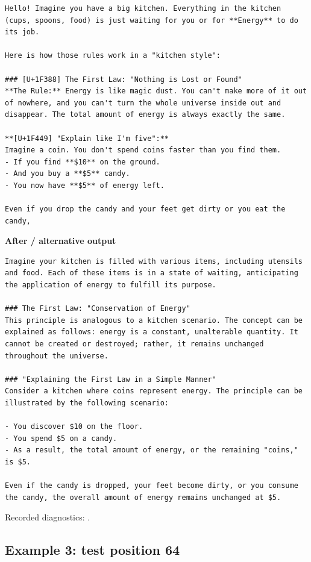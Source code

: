 \begin{Verbatim}
Hello! Imagine you have a big kitchen. Everything in the kitchen (cups, spoons, food) is just waiting for you or for **Energy** to do its job.

Here is how those rules work in a "kitchen style":

### [U+1F388] The First Law: "Nothing is Lost or Found"
**The Rule:** Energy is like magic dust. You can't make more of it out of nowhere, and you can't turn the whole universe inside out and disappear. The total amount of energy is always exactly the same.

**[U+1F449] "Explain like I'm five":**
Imagine a coin. You don't spend coins faster than you find them.
- If you find **$10** on the ground.
- And you buy a **$5** candy.
- You now have **$5** of energy left.

Even if you drop the candy and your feet get dirty or you eat the candy,
\end{Verbatim}

\textbf{After / alternative output}

\begin{Verbatim}
Imagine your kitchen is filled with various items, including utensils and food. Each of these items is in a state of waiting, anticipating the application of energy to fulfill its purpose.

### The First Law: "Conservation of Energy"
This principle is analogous to a kitchen scenario. The concept can be explained as follows: energy is a constant, unalterable quantity. It cannot be created or destroyed; rather, it remains unchanged throughout the universe.

### "Explaining the First Law in a Simple Manner"
Consider a kitchen where coins represent energy. The principle can be illustrated by the following scenario:

- You discover $10 on the floor.
- You spend $5 on a candy.
- As a result, the total amount of energy, or the remaining "coins," is $5.

Even if the candy is dropped, your feet become dirty, or you consume the candy, the overall amount of energy remains unchanged at $5.
\end{Verbatim}

Recorded diagnostics:
\texttt{}.

\subsection{Example 3: test position
64}\label{record-docs-watermarking-qualitative-text-latent-vanilla-md-example-3-test-position-64}

